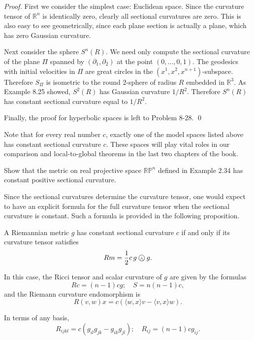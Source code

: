 \begin{proof}
First we consider the simplest case: Euclidean space. Since the curvature tensor of $\mathbb{R}^n$ is identically zero, clearly all sectional curvatures are zero. This is also easy to see geometrically, since each plane section is actually a plane, which has zero Gaussian curvature.

Next consider the sphere $S^n(R)$. We need only compute the sectional curvature of the plane $\Pi$ spanned by $(\partial_1, \partial_2)$ at the point $(0, \ldots, 0, 1)$. The geodesics with initial velocities in $\Pi$ are great circles in the $(x^1, x^2, x^{n+1})$-subspace. Therefore $S_\Pi$ is isometric to the round 2-sphere of radius $R$ embedded in $\mathbb{R}^3$. As Example 8.25 showed, $S^2(R)$ has Gaussian curvature $1/R^2$. Therefore $S^n(R)$ has constant sectional curvature equal to $1/R^2$.

Finally, the proof for hyperbolic spaces is left to Problem 8-28. \qed
\end{proof}

Note that for every real number $c$, exactly one of the model spaces listed above has constant sectional curvature $c$. These spaces will play vital roles in our comparison and local-to-global theorems in the last two chapters of the book.

\begin{exercise}
\label{exer:constant-sectional-curvature-rp}
Show that the metric on real projective space $\mathbb{RP}^n$ defined in Example 2.34 has constant positive sectional curvature.
\end{exercise}

Since the sectional curvatures determine the curvature tensor, one would expect to have an explicit formula for the full curvature tensor when the sectional curvature is constant. Such a formula is provided in the following proposition.

\begin{proposition}
\label{prop:constant-sectional-curvature}
A Riemannian metric $g$ has constant sectional curvature $c$ if and only if its curvature tensor satisfies
\[
Rm = \frac{1}{2}c\, g \owedge g.
\]

In this case, the Ricci tensor and scalar curvature of $g$ are given by the formulas
\[
Rc = (n-1)cg; \quad S = n(n-1)c,
\]
and the Riemann curvature endomorphism is
\[
R(v,w)x = c(\langle w,x\rangle v - \langle v,x\rangle w).
\]

In terms of any basis,
\[
R_{ijkl} = c(g_{il}g_{jk} - g_{ik}g_{jl}); \quad R_{ij} = (n-1)cg_{ij}.
\]
\end{proposition}

